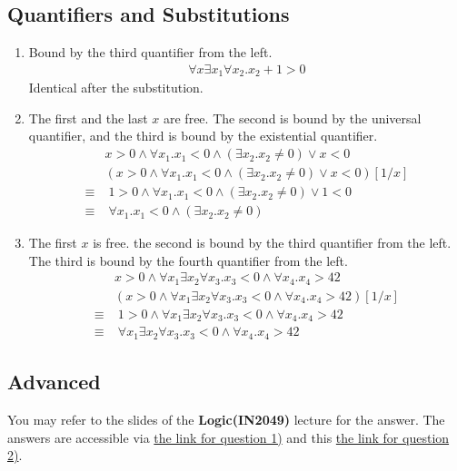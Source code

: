 \documentclass[12pt]{article}
\begin{document}
\subsection*{Quantifiers and Substitutions}
\begin{enumerate}
    \item Bound by the third quantifier from the left. 
    \begin{align*}
        \forall x \exists x_1 \forall x_2. x_2 + 1 > 0
    \end{align*}
    Identical after the substitution.
    \item The first and the last $x$ are free. The second is bound by the universal quantifier, and 
    the third is bound by the existential quantifier.
    \begin{align*}
        &x > 0 \land \forall x_1. x_1 < 0 \land (\exists x_2. x_2 \not= 0) \lor x < 0\\
        &(x > 0 \land \forall x_1. x_1 < 0 \land (\exists x_2. x_2 \not= 0) \lor x < 0)[1/x]\\
        \equiv&\; 1 > 0 \land \forall x_1. x_1 < 0 \land (\exists x_2. x_2 \not= 0) \lor 1 < 0\\ 
        \equiv&\;  \forall x_1. x_1 < 0 \land (\exists x_2. x_2 \not= 0)
    \end{align*}
    \item The first $x$ is free. the second is bound by the third quantifier from the left. 
    The third is bound by the fourth quantifier from the left.
    \begin{align*}
        &x > 0 \land \forall x_1 \exists x_2 \forall x_3. x_3 < 0 \land \forall x_4. x_4 > 42\\
        &(x > 0 \land \forall x_1 \exists x_2 \forall x_3. x_3 < 0 \land \forall x_4. x_4 > 42)[1/x]\\
        \equiv& \; 1 > 0 \land \forall x_1 \exists x_2 \forall x_3. x_3 < 0 \land \forall x_4. x_4 > 42 \\
        \equiv& \; \forall x_1 \exists x_2 \forall x_3. x_3 < 0 \land \forall x_4. x_4 > 42
    \end{align*}
\end{enumerate}

\subsection*{Advanced}
You may refer to the slides of the \textbf{Logic(IN2049)} lecture for the answer. The answers are accessible via 
\href{https://www21.in.tum.de/teaching/logic/SS22/assets/fol.pdf}{the link for question 1)} 
and this \href{https://www21.in.tum.de/teaching/logic/SS22/assets/normal-fol.pdf}{the link for question 2)}.
\end{document}
